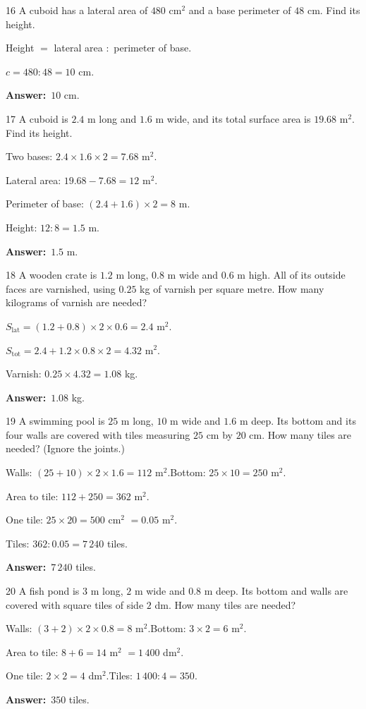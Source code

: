 \documentclass[11pt]{article}
\newif\ifsol \solfalse
\providecommand{\AnsWord}{Đáp số}
\newcommand{\dapso}[1]{\par\textbf{\AnsWord:}\ #1}
\newcommand{\probsol}[1]{%
  \begin{lrbox}{\solmeasure}\begin{minipage}{\dimexpr\linewidth-24pt\relax}#1\end{minipage}\end{lrbox}%
  \ifsol
    \begin{solbox}#1\end{solbox}%
  \else
    \setlength{\solht}{\dimexpr\ht\solmeasure+\dp\solmeasure+0.85cm\relax}%
    \ifdim\solht<1.35cm\setlength{\solht}{1.35cm}\fi
    \begin{tcolorbox}[colback=white,colframe=Line,boxrule=0.8pt,arc=5pt,
      left=8pt,right=8pt,top=4pt,bottom=4pt,height=\solht]{\footnotesize\color{Slate}\itshape\WorkWord}\end{tcolorbox}%
  \fi}
\newcommand{\gap}{\vspace{0.3cm}}
\def\WorkWord{Your work:}
\def\AnsWord{Answer}
\begin{document}
\gap
\begin{probbox}{16}{\relax}
A cuboid has a lateral area of $480$ cm$^2$ and a base perimeter of $48$ cm. Find its height.
\end{probbox}
\probsol{
Height $=$ lateral area $:$ perimeter of base.\par
$c=480:48=10$ cm.
\dapso{$10$ cm.}}
\gap
\begin{probbox}{17}{\relax}
A cuboid is $2.4$ m long and $1.6$ m wide, and its total surface area is $19.68$ m$^2$. Find its height.
\end{probbox}
\probsol{
Two bases: $2.4\times1.6\times2=7.68$ m$^2$.\par
Lateral area: $19.68-7.68=12$ m$^2$.\par
Perimeter of base: $(2.4+1.6)\times2=8$ m.\par
Height: $12:8=1.5$ m.
\dapso{$1.5$ m.}}
\gap
\begin{probbox}{18}{\relax}
A wooden crate is $1.2$ m long, $0.8$ m wide and $0.6$ m high. All of its outside faces are varnished, using $0.25$ kg of varnish per square metre. How many kilograms of varnish are needed?
\end{probbox}
\probsol{
$S_{\text{lat}}=(1.2+0.8)\times2\times0.6=2.4$ m$^2$.\par
$S_{\text{tot}}=2.4+1.2\times0.8\times2=4.32$ m$^2$.\par
Varnish: $0.25\times4.32=1.08$ kg.
\dapso{$1.08$ kg.}}
\gap
\begin{probbox}{19}{\relax}
A swimming pool is $25$ m long, $10$ m wide and $1.6$ m deep. Its bottom and its four walls are covered with tiles measuring $25$ cm by $20$ cm. How many tiles are needed? (Ignore the joints.)
\end{probbox}
\probsol{
Walls: $(25+10)\times2\times1.6=112$ m$^2$.\quad Bottom: $25\times10=250$ m$^2$.\par
Area to tile: $112+250=362$ m$^2$.\par
One tile: $25\times20=500$ cm$^2$ $=0.05$ m$^2$.\par
Tiles: $362:0.05=7\,240$ tiles.
\dapso{$7\,240$ tiles.}}
\gap
\begin{probbox}{20}{\relax}
A fish pond is $3$ m long, $2$ m wide and $0.8$ m deep. Its bottom and walls are covered with square tiles of side $2$ dm. How many tiles are needed?
\end{probbox}
\probsol{
Walls: $(3+2)\times2\times0.8=8$ m$^2$.\quad Bottom: $3\times2=6$ m$^2$.\par
Area to tile: $8+6=14$ m$^2$ $=1\,400$ dm$^2$.\par
One tile: $2\times2=4$ dm$^2$.\quad Tiles: $1\,400:4=350$.
\dapso{$350$ tiles.}}
\end{document}

